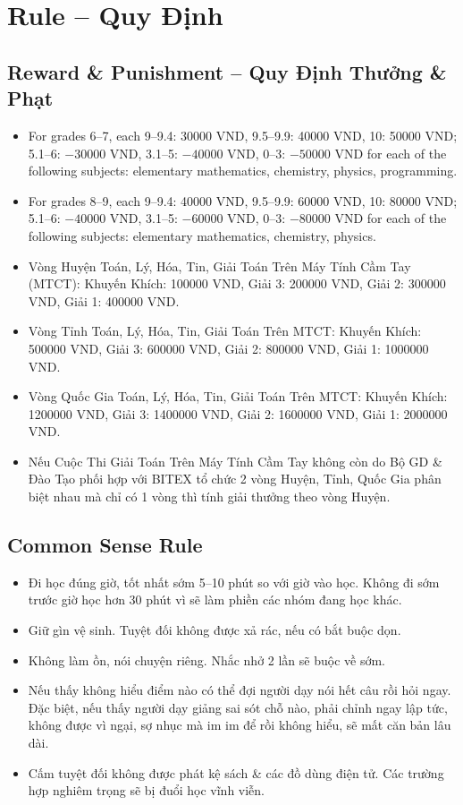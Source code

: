 \documentclass{article}
\numberwithin{equation}{section}
\begin{document}

\section{Rule -- Quy Định}

\subsection{Reward \& Punishment -- Quy Định Thưởng \& Phạt}
\begin{itemize}
	\item For grades 6--7, each 9--9.4: 30000 VND, 9.5--9.9: 40000 VND, 10: 50000 VND; 5.1--6: $-30000$ VND, 3.1--5: $-40000$ VND, 0--3: $-50000$ VND for each of the following subjects: elementary mathematics, chemistry, physics, programming.
	\item For grades 8--9, each 9--9.4: 40000 VND, 9.5--9.9: 60000 VND, 10: 80000 VND; 5.1--6: $-40000$ VND, 3.1--5: $-60000$ VND, 0--3: $-80000$ VND for each of the following subjects: elementary mathematics, chemistry, physics.
	\item Vòng Huyện Toán, Lý, Hóa, Tin, Giải Toán Trên Máy Tính Cầm Tay (MTCT): Khuyến Khích: 100000 VND, Giải 3: 200000 VND, Giải 2: 300000 VND, Giải 1: 400000 VND.
	\item Vòng Tỉnh Toán, Lý, Hóa, Tin, Giải Toán Trên MTCT: Khuyến Khích: 500000 VND, Giải 3: 600000 VND, Giải 2: 800000 VND, Giải 1: 1000000 VND.
	\item Vòng Quốc Gia Toán, Lý, Hóa, Tin, Giải Toán Trên MTCT: Khuyến Khích: 1200000 VND, Giải 3: 1400000 VND, Giải 2: 1600000 VND, Giải 1: 2000000 VND.
	\item Nếu Cuộc Thi Giải Toán Trên Máy Tính Cầm Tay không còn do Bộ GD \& Đào Tạo phối hợp với BITEX tổ chức 2 vòng Huyện, Tỉnh, Quốc Gia phân biệt nhau mà chỉ có 1 vòng thì tính giải thưởng theo vòng Huyện.
\end{itemize}

\subsection{Common Sense Rule}

\begin{itemize}
	\item Đi học đúng giờ, tốt nhất sớm 5--10 phút so với giờ vào học. Không đi sớm trước giờ học hơn 30 phút vì sẽ làm phiền các nhóm đang học khác.
	\item Giữ gìn vệ sinh. Tuyệt đối không được xả rác, nếu có bắt buộc dọn.
	\item Không làm ồn, nói chuyện riêng. Nhắc nhở 2 lần sẽ buộc về sớm.
	\item Nếu thấy không hiểu điểm nào có thể đợi người dạy nói hết câu rồi hỏi ngay. Đặc biệt, nếu thấy người dạy giảng sai sót chỗ nào, phải chỉnh ngay lập tức, không được vì ngại, sợ nhục mà im im để rồi không hiểu, sẽ mất căn bản lâu dài.
	\item Cấm tuyệt đối không được phát kệ sách \& các đồ dùng điện tử. Các trường hợp nghiêm trọng sẽ bị đuổi học vĩnh viễn.
\end{itemize}
\end{document}

